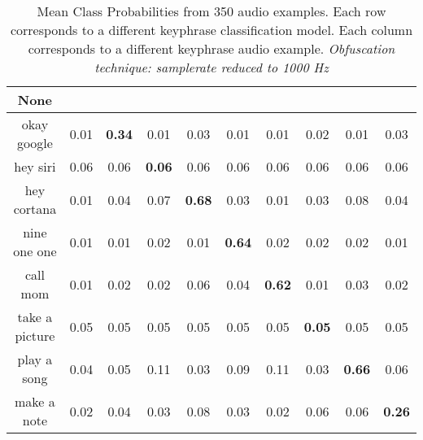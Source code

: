 \begin{table}[!th]
\begin{tabular}{cccccccccc}%
\hline%
None&\rotate{random talk}{70}&\rotate{okay google}{70}&\rotate{hey siri}{70}&\rotate{hey cortana}{70}&\rotate{nine one one}{70}&\rotate{call mom}{70}&\rotate{take a picture}{70}&\rotate{play a song}{70}&\rotate{make a note}{70}\\%
\hline%
okay google&0.01&\textbf{0.34}&0.01&0.03&0.01&0.01&0.02&0.01&0.03\\%
hey siri&0.06&0.06&\textbf{0.06}&0.06&0.06&0.06&0.06&0.06&0.06\\%
hey cortana&0.01&0.04&0.07&\textbf{0.68}&0.03&0.01&0.03&0.08&0.04\\%
nine one one&0.01&0.01&0.02&0.01&\textbf{0.64}&0.02&0.02&0.02&0.01\\%
call mom&0.01&0.02&0.02&0.06&0.04&\textbf{0.62}&0.01&0.03&0.02\\%
take a picture&0.05&0.05&0.05&0.05&0.05&0.05&\textbf{0.05}&0.05&0.05\\%
play a song&0.04&0.05&0.11&0.03&0.09&0.11&0.03&\textbf{0.66}&0.06\\%
make a note&0.02&0.04&0.03&0.08&0.03&0.02&0.06&0.06&\textbf{0.26}\\%
\hline%
\end{tabular}
\caption{Mean Class Probabilities from 350 audio examples. Each row corresponds to a different keyphrase classification model. Each column corresponds to a different keyphrase audio example. \emph{Obfuscation technique: samplerate reduced to 1000 Hz}}
\label{tab:probs_samplerate_1000}
\end{table}





